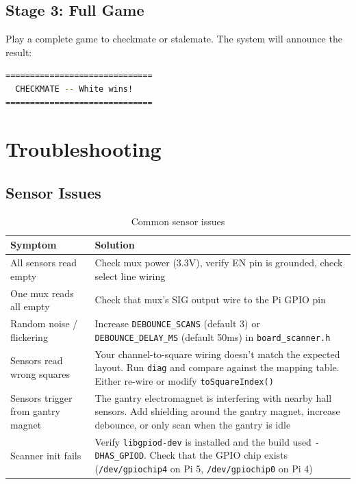 \documentclass[11pt,a4paper]{report}
\begin{document}
\section{Stage 3: Full Game}

Play a complete game to checkmate or stalemate. The system will announce the result:

\begin{lstlisting}[language=bash, numbers=none]
==============================
  CHECKMATE -- White wins!
==============================
\end{lstlisting}


\chapter{Troubleshooting}

\section{Sensor Issues}

\begin{table}[H]
\centering
\begin{tabular}{p{5cm}p{9cm}}
\toprule
\textbf{Symptom} & \textbf{Solution} \\
\midrule
All sensors read empty & Check mux power (3.3V), verify EN pin is grounded, check select line wiring \\
\addlinespace
One mux reads all empty & Check that mux's SIG output wire to the Pi GPIO pin \\
\addlinespace
Random noise / flickering & Increase \texttt{DEBOUNCE\_SCANS} (default 3) or \texttt{DEBOUNCE\_DELAY\_MS} (default 50ms) in \texttt{board\_scanner.h} \\
\addlinespace
Sensors read wrong squares & Your channel-to-square wiring doesn't match the expected layout. Run \texttt{diag} and compare against the mapping table. Either re-wire or modify \texttt{toSquareIndex()} \\
\addlinespace
Sensors trigger from gantry magnet & The gantry electromagnet is interfering with nearby hall sensors. Add shielding around the gantry magnet, increase debounce, or only scan when the gantry is idle \\
\addlinespace
Scanner init fails & Verify \texttt{libgpiod-dev} is installed and the build used \texttt{-DHAS\_GPIOD}. Check that the GPIO chip exists (\texttt{/dev/gpiochip4} on Pi 5, \texttt{/dev/gpiochip0} on Pi 4) \\
\bottomrule
\end{tabular}
\caption{Common sensor issues}
\end{table}
\end{document}
